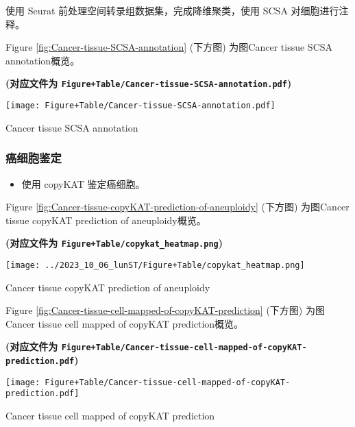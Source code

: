 \documentclass[
]{article}
\providecommand{\tightlist}{%
  \setlength{\itemsep}{0pt}\setlength{\parskip}{0pt}}
\begin{document}
使用 Seurat 前处理空间转录组数据集，完成降维聚类，使用 SCSA 对细胞进行注释。

Figure \ref{fig:Cancer-tissue-SCSA-annotation} (下方图) 为图Cancer tissue SCSA annotation概览。

\textbf{(对应文件为 \texttt{Figure+Table/Cancer-tissue-SCSA-annotation.pdf})}

\def\@captype{figure}
\begin{center}
\texttt{[image: Figure+Table/Cancer-tissue-SCSA-annotation.pdf]}
\caption{Cancer tissue SCSA annotation}\label{fig:Cancer-tissue-SCSA-annotation}
\end{center}

\hypertarget{ux764cux7ec6ux80deux9274ux5b9a}{%
\subsubsection{癌细胞鉴定}\label{ux764cux7ec6ux80deux9274ux5b9a}}

\begin{itemize}
\tightlist
\item
  使用 copyKAT 鉴定癌细胞。
\end{itemize}

Figure \ref{fig:Cancer-tissue-copyKAT-prediction-of-aneuploidy} (下方图) 为图Cancer tissue copyKAT prediction of aneuploidy概览。

\textbf{(对应文件为 \texttt{Figure+Table/copykat\_heatmap.png})}

\def\@captype{figure}
\begin{center}
\texttt{[image: ../2023\_10\_06\_lunST/Figure+Table/copykat\_heatmap.png]}
\caption{Cancer tissue copyKAT prediction of aneuploidy}\label{fig:Cancer-tissue-copyKAT-prediction-of-aneuploidy}
\end{center}

Figure \ref{fig:Cancer-tissue-cell-mapped-of-copyKAT-prediction} (下方图) 为图Cancer tissue cell mapped of copyKAT prediction概览。

\textbf{(对应文件为 \texttt{Figure+Table/Cancer-tissue-cell-mapped-of-copyKAT-prediction.pdf})}

\def\@captype{figure}
\begin{center}
\texttt{[image: Figure+Table/Cancer-tissue-cell-mapped-of-copyKAT-prediction.pdf]}
\caption{Cancer tissue cell mapped of copyKAT prediction}\label{fig:Cancer-tissue-cell-mapped-of-copyKAT-prediction}
\end{center}
\end{document}
